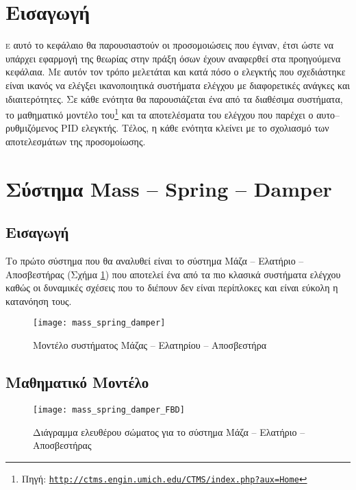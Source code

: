 


\section{Εισαγωγή}

\lettrine[findent=2pt]{}{ε} αυτό το κεφάλαιο θα παρουσιαστούν οι προσομοιώσεις που έγιναν, έτσι ώστε να υπάρχει εφαρμογή της θεωρίας στην πράξη όσων έχουν αναφερθεί στα προηγούμενα κεφάλαια. Με αυτόν τον τρόπο μελετάται και κατά πόσο ο ελεγκτής που σχεδιάστηκε είναι ικανός να ελέγξει ικανοποιητικά συστήματα ελέγχου με διαφορετικές ανάγκες και ιδιαιτερότητες. Σε κάθε ενότητα θα παρουσιάζεται ένα από τα διαθέσιμα συστήματα, το μαθηματικό μοντέλο του\footnote{Πηγή: \texttt{\url{http://ctms.engin.umich.edu/CTMS/index.php?aux=Home}}} και τα αποτελέσματα του ελέγχου που παρέχει ο αυτο--ρυθμιζόμενος PID ελεγκτής. Τέλος, η κάθε ενότητα κλείνει με το σχολιασμό των αποτελεσμάτων της προσομοίωσης.

\section{Σύστημα Mass -- Spring -- Damper} \label{sec:mass_spring_damper}

\subsection{Εισαγωγή}

Το πρώτο σύστημα που θα αναλυθεί είναι το σύστημα Μάζα -- Ελατήριο -- Αποσβεστήρας (Σχήμα \ref{fig:mass_spring_damper}) που αποτελεί ένα από τα πιο κλασικά συστήματα ελέγχου καθώς οι δυναμικές σχέσεις που το διέπουν δεν είναι περίπλοκες και είναι εύκολη η κατανόηση τους.

\begin{figure}[h]
  \centering
  \texttt{[image: mass\_spring\_damper]}
  \caption{Μοντέλο συστήματος Μάζας -- Ελατηρίου -- Αποσβεστήρα}
  \label{fig:mass_spring_damper}
\end{figure}

\subsection{Μαθηματικό Μοντέλο}

\begin{figure}[h]
  \centering
  \texttt{[image: mass\_spring\_damper\_FBD]}
  \caption{Διάγραμμα ελευθέρου σώματος για το σύστημα Μάζα -- Ελατήριο -- Αποσβεστήρας}
  \label{fig:mass_spring_damper_FBD}
\end{figure}

